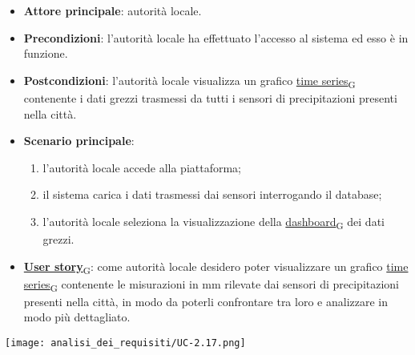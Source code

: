 \begin{itemize}
	\item \textbf{Attore principale}: autorità locale.
	\item \textbf{Precondizioni}: l'autorità locale ha effettuato l'accesso al sistema ed esso è in funzione.
	\item \textbf{Postcondizioni}: l'autorità locale visualizza un grafico \href{https://7last.github.io/docs/pb/documentazione-interna/glossario\#time-series}{time series\textsubscript{G}} contenente i dati grezzi trasmessi da tutti i sensori
	      di precipitazioni presenti nella città.
	\item \textbf{Scenario principale}:
	      \begin{enumerate}
		      \item l'autorità locale accede alla piattaforma;
		      \item il sistema carica i dati trasmessi dai sensori interrogando il database;
		      \item l'autorità locale seleziona la visualizzazione della \href{https://7last.github.io/docs/pb/documentazione-interna/glossario\#dashboard}{dashboard\textsubscript{G}} dei dati grezzi.
	      \end{enumerate}
	\item \href{https://7last.github.io/docs/pb/documentazione-interna/glossario\#user-story}{\textbf{User story}\textsubscript{G}}:
	      come autorità locale desidero poter visualizzare un grafico \href{https://7last.github.io/docs/pb/documentazione-interna/glossario\#time-series}{time series\textsubscript{G}} contenente le misurazioni in mm rilevate dai sensori
	      di precipitazioni presenti nella città, in modo da poterli confrontare tra loro e analizzare in modo più dettagliato.
\end{itemize}
\begin{center}
	\texttt{[image: analisi\_dei\_requisiti/UC-2.17.png]}
\end{center}


